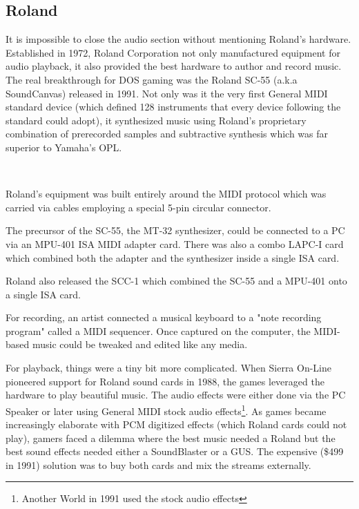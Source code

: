  \subsection{Roland}
 It is impossible to close the audio section without mentioning Roland's hardware. Established in 1972, Roland Corporation not only manufactured equipment for audio playback, it also provided the best hardware to author and record music. The real breakthrough for DOS gaming was the Roland SC-55 (a.k.a SoundCanvas) released in 1991. Not only was it the very first General MIDI standard device (which defined 128 instruments that every device following the standard could adopt), it synthesized music using Roland's proprietary combination of prerecorded samples and subtractive synthesis which was far superior to Yamaha's OPL.\\
 \par
 \\
 \par

Roland's equipment was built entirely around the MIDI protocol which was carried via cables employing a special 5-pin circular connector.\\
\par
 The precursor of the SC-55, the MT-32 synthesizer, could be connected to a PC via an MPU-401 ISA MIDI adapter card. There was also a combo LAPC-I card which combined both the adapter and the synthesizer inside a single ISA card.\\
\par 
{}
\par
Roland also released the SCC-1 which combined the SC-55 and a MPU-401 onto a single ISA card.\\
\par 
{}
\par
\pagebreak
For recording, an artist connected a musical keyboard to a "note recording program" called a MIDI sequencer. Once captured on the computer, the MIDI-based music could be tweaked and edited like any media.\\

\par
For playback, things were a tiny bit more complicated. When Sierra On-Line pioneered support for Roland sound cards in 1988, the games leveraged the hardware to play beautiful music. The audio effects were either done via the PC Speaker or later using General MIDI stock audio effects\footnote{Another World in 1991 used the stock audio effects}. As games became increasingly elaborate with PCM digitized effects (which Roland cards could not play), gamers faced a dilemma where the best music needed a Roland but the best sound effects needed either a SoundBlaster or a GUS. The expensive (\$499 in 1991) solution was to buy both cards and mix the streams externally.\\
\par
{}

